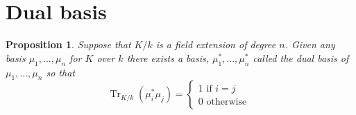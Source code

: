 \documentclass{article}
\DeclareMathOperator{\tr}{Tr}
\newtheorem{proposition}{Proposition}[section]
\begin{document}





 


\section{Dual basis}

\begin{proposition}\label{prop: Existence of dual basis}
    Suppose that $K/k$ is a field extension of degree $n$. Given any basis $\mu_1, ..., \mu_n$ for $K$ over $k$ there exists a basis, $\mu_1^*, ..., \mu_n^*$ called the dual basis of $\mu_1, ..., \mu_n$ so that 
    $$\tr_{K/k}(\mu_i^* \mu_j) = \begin{cases*}
        1 \text{ if } i = j \\
        0 \text{ otherwise }
    \end{cases*}$$
\end{proposition}
\end{document}
